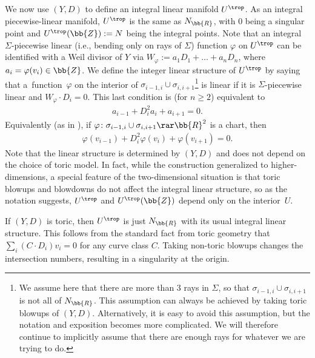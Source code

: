 We now use $(Y,D)$ to define an integral linear manifold $U^{\trop}$. As an integral piecewise-linear manifold, $U^{\trop}$ is the same as $N_{\bb{R}}$, with $0$ being a singular point and $U^{\trop}(\bb{Z}):=N$ being the integral points.
 Note that an integral $\Sigma$-piecewise linear (i.e., bending only on rays of $\Sigma$) function $\varphi$ on $U^{\trop}$ can be identified with a Weil divisor of $Y$ via $W_{\varphi}:=a_1D_1+\dots + a_n D_n$, where $a_i = \varphi(v_i)\in \bb{Z}$. We define the integer linear structure of $U^{\trop}$ by saying that a~func\-tion~$\varphi$ on the interior of $\sigma_{i-1,i}\cup\sigma_{i,i+1}$\footnote{We assume here that there are more than $3$ rays in $\Sigma$, so that $\sigma_{i-1,i}\cup \sigma_{i,i+1}$ is not all of $N_{\bb{R}}$. This assumption can always be achieved by taking toric blowups of $(Y,D)$. Alternatively, it is easy to avoid this assumption, but the notation and exposition becomes more complicated. We will therefore continue to implicitly assume that there are enough rays for whatever we are trying to do.} is linear if it is $\Sigma$-piecewise linear and $W_\varphi \cdot D_{i} = 0$. This last condition is (for $n\geq 2$) equivalent to
\begin{gather*}
	a_{i-1} +D_{i}^2 a_{i} + a_{i+1} = 0.
\end{gather*}
Equivalently (as in \cite{GHK1}), if $\varphi\colon \sigma_{i-1,i}\cup \sigma_{i,i+1}\rar \bb{R}^2$ is a chart, then
\begin{gather} \label{linear}
	\varphi(v_{i-1})+D_{i}^2 \varphi(v_i) + \varphi(v_{i+1}) = 0.
\end{gather}
Note that the linear structure is determined by $(Y,D)$ and does not depend on the choice of toric model. In fact, while the construction generalized to higher-dimensions, a special feature of the two-dimensional situation is that toric blowups and blowdowns do not affect the integral linear structure, so as the notation suggests, $U^{\trop}$ and $U^{\trop}(\bb{Z})$ depend only on the interior~$U$.

\begin{eg}
If $(Y,D)$ is toric, then $U^{\trop}$ is just $N_{\bb{R}}$ with its usual integral linear structure. This follows from the standard fact from toric geometry that
$
	\sum_i (C \cdot D_i) v_i = 0
$
for any curve class $C$. Taking non-toric blowups changes the intersection numbers, resulting in a singularity at the origin.
\end{eg}

